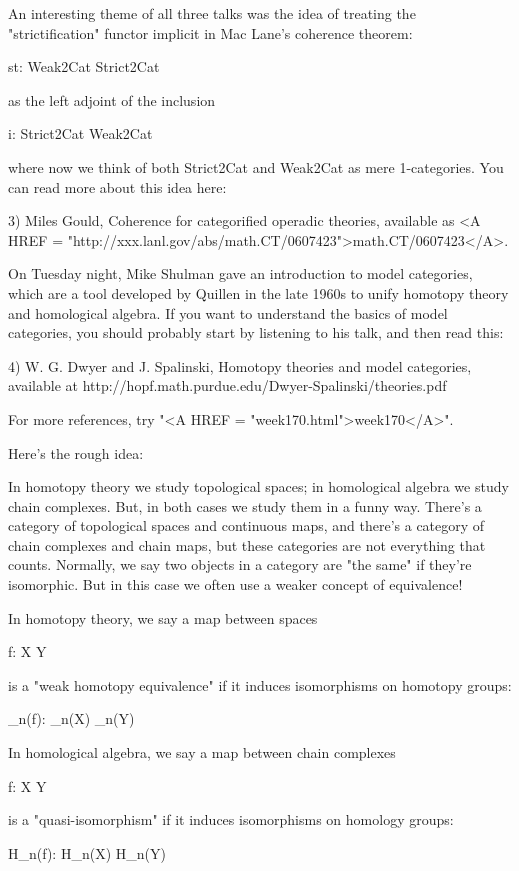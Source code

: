An interesting theme of all three talks was the idea of treating 
the "strictification" functor implicit in Mac Lane's coherence 
theorem:

st: Weak2Cat \to  Strict2Cat

as the left adjoint of the inclusion

i: Strict2Cat \to  Weak2Cat

where now we think of both Strict2Cat and Weak2Cat as mere 
1-categories.  You can read more about this idea here:

3) Miles Gould, Coherence for categorified operadic theories, 
available as <A HREF = "http://xxx.lanl.gov/abs/math.CT/0607423">math.CT/0607423</A>.

On Tuesday night, Mike Shulman gave an introduction to model 
categories, which are a tool developed by Quillen in the late
1960s to unify homotopy theory and homological algebra.
If you want to understand the basics of model categories, you 
should probably start by listening to his talk, and then read
this:

4) W. G. Dwyer and J. Spalinski, Homotopy theories and model 
categories, available at 
http://hopf.math.purdue.edu/Dwyer-Spalinski/theories.pdf

For more references, try "<A HREF =
"week170.html">week170</A>".

Here's the rough idea:

In homotopy theory we study topological spaces; in homological
algebra we study chain complexes.  But, in both cases we study
them in a funny way.  There's a category of topological spaces
and continuous maps, and there's a category of chain complexes 
and chain maps, but these categories are not everything that 
counts.  Normally, we say two objects in a category are "the
same" if they're isomorphic.  But in this case we often use a
weaker concept of equivalence!

In homotopy theory, we say a map between spaces

f: X \to  Y

is a "weak homotopy equivalence" if it induces isomorphisms on
homotopy groups:

\pi _{n}(f): \pi _{n}(X) \to  \pi _{n}(Y)

In homological algebra, we say a map between chain complexes

f: X \to  Y 

is a "quasi-isomorphism" if it induces isomorphisms on
homology groups:

H_{n}(f): H_{n}(X) \to  H_{n}(Y)

